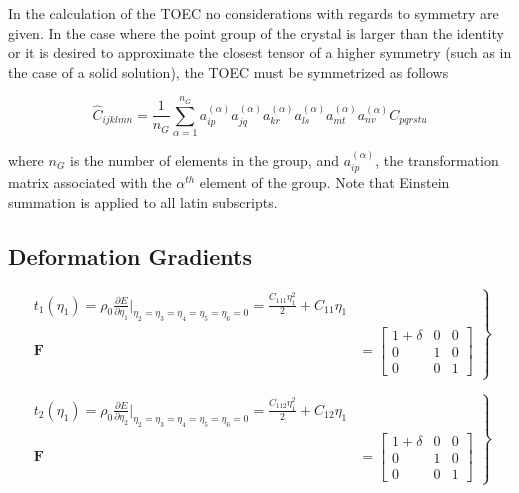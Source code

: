 \documentclass[showpacs,aps,floatfix,prb,reprint,superscriptaddress,onecolumn]{revtex4-1}
\begin{document}
In the calculation of the TOEC no considerations with regards to symmetry are given.  In the case where the point group of the crystal is larger than the identity or it is desired to approximate the closest tensor of a higher symmetry (such as in the case of a solid solution), the TOEC must be symmetrized as follows

\begin{equation}
\hat{C}_{ijklmn} = \frac{1}{n_G} \sum\limits_{\alpha=1}^{n_G}  a^{(\alpha)}_{ip}  a^{(\alpha)}_{jq}  a^{(\alpha)}_{kr}  a^{(\alpha)}_{ls}  a^{(\alpha)}_{mt}  a^{(\alpha)}_{nv} C_{pqrstu}
\end{equation}

where $n_G$ is the number of elements in the group, and $a_{ip}^{(\alpha)}$, the transformation matrix associated with the $\alpha^{th}$ element of the group.  Note that Einstein summation is applied to all latin subscripts.



\subsection{Deformation Gradients}


\begin{equation}
\label{eqn:SM-hexs1}
  \left.\begin{aligned}
        t_{1} \left(\eta_{1}\right) = \rho_{0} \frac{\partial E}{\partial \eta_{1}}\Bigr|_{\eta_2=\eta_3=\eta_4=\eta_5=\eta_6=0} = \frac{C_{111}\eta_{1}^2}{2} + C_{11}\eta_{1}\\
        \bm{F}&=\begin{bmatrix} 1+\delta & 0 & 0 \\ 0 & 1 & 0 \\ 0 & 0 & 1 \end{bmatrix}
       \end{aligned}
			\right\}
\end{equation}


\begin{equation}
\label{eqn:SM-hexs2}
  \left.\begin{aligned}
        t_{2} \left(\eta_{1}\right) = \rho_{0} \frac{\partial E}{\partial \eta_{2}}\Bigr|_{\eta_2=\eta_3=\eta_4=\eta_5=\eta_6=0} = \frac{C_{112}\eta_{1}^2}{2} + C_{12}\eta_{1}\\
        \bm{F}&=\begin{bmatrix} 1+\delta & 0 & 0 \\ 0 & 1 & 0 \\ 0 & 0 & 1 \end{bmatrix}
       \end{aligned}
			\right\}
\end{equation}
\end{document}

